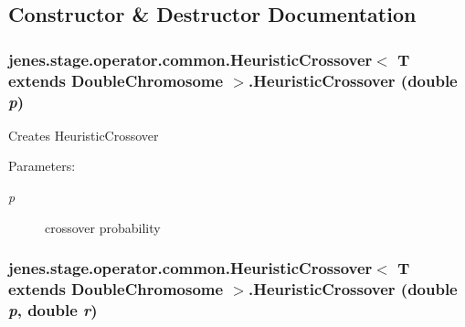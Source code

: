 \subsection{Constructor \& Destructor Documentation}
\hypertarget{classjenes_1_1stage_1_1operator_1_1common_1_1_heuristic_crossover_3_01_t_01extends_01_double_chromosome_01_4_b1d3d3ec4281a97824e9859fddfba792}{
\subsubsection[HeuristicCrossover]{\setlength{\rightskip}{0pt plus 5cm}jenes.stage.operator.common.HeuristicCrossover$<$ T extends {\bf DoubleChromosome} $>$.HeuristicCrossover (double {\em p})}}
\label{classjenes_1_1stage_1_1operator_1_1common_1_1_heuristic_crossover_3_01_t_01extends_01_double_chromosome_01_4_b1d3d3ec4281a97824e9859fddfba792}


Creates HeuristicCrossover

\begin{Desc}
\item[Parameters:]
\begin{description}
\item[{\em p}]crossover probability \end{description}
\end{Desc}
\hypertarget{classjenes_1_1stage_1_1operator_1_1common_1_1_heuristic_crossover_3_01_t_01extends_01_double_chromosome_01_4_45df3b701ffb650f013d3b65753f4ffa}{
\subsubsection[HeuristicCrossover]{\setlength{\rightskip}{0pt plus 5cm}jenes.stage.operator.common.HeuristicCrossover$<$ T extends {\bf DoubleChromosome} $>$.HeuristicCrossover (double {\em p}, \/  double {\em r})}}
\label{classjenes_1_1stage_1_1operator_1_1common_1_1_heuristic_crossover_3_01_t_01extends_01_double_chromosome_01_4_45df3b701ffb650f013d3b65753f4ffa}



